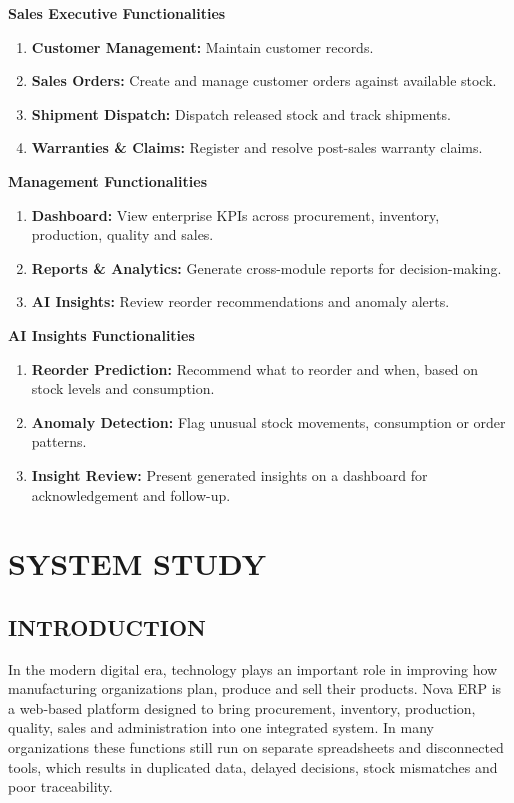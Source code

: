 \documentclass[12pt,a4paper]{report}
\newcommand{\chap}[1]{\chapter{#1}\thispagestyle{empty}\clearpage}
\begin{document}
\textbf{Sales Executive Functionalities}
\begin{enumerate}
\item \textbf{Customer Management:} Maintain customer records.
\item \textbf{Sales Orders:} Create and manage customer orders against available stock.
\item \textbf{Shipment Dispatch:} Dispatch released stock and track shipments.
\item \textbf{Warranties \& Claims:} Register and resolve post-sales warranty claims.
\end{enumerate}

\textbf{Management Functionalities}
\begin{enumerate}
\item \textbf{Dashboard:} View enterprise KPIs across procurement, inventory, production, quality and sales.
\item \textbf{Reports \& Analytics:} Generate cross-module reports for decision-making.
\item \textbf{AI Insights:} Review reorder recommendations and anomaly alerts.
\end{enumerate}

\textbf{AI Insights Functionalities}
\begin{enumerate}
\item \textbf{Reorder Prediction:} Recommend what to reorder and when, based on stock levels and consumption.
\item \textbf{Anomaly Detection:} Flag unusual stock movements, consumption or order patterns.
\item \textbf{Insight Review:} Present generated insights on a dashboard for acknowledgement and follow-up.
\end{enumerate}

\chap{SYSTEM STUDY}

\section{INTRODUCTION}
In the modern digital era, technology plays an important role in improving how manufacturing organizations plan, produce and sell their products. Nova ERP is a web-based platform designed to bring procurement, inventory, production, quality, sales and administration into one integrated system. In many organizations these functions still run on separate spreadsheets and disconnected tools, which results in duplicated data, delayed decisions, stock mismatches and poor traceability.
\end{document}
